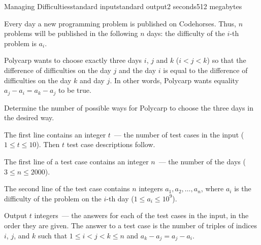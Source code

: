 \begin{problem}{Managing Difficulties}{standard input}{standard output}{2 seconds}{512 megabytes}

Every day a new programming problem is published on Codehorses. Thus, $n$ problems will be published in the following $n$ days: the difficulty of the $i$-th problem is $a_i$.

Polycarp wants to choose exactly three days $i$, $j$ and $k$ ($i < j < k$) so that the difference of difficulties on the day $j$ and the day $i$ is equal to the difference of difficulties on the day $k$ and day $j$.
In other words, Polycarp wants equality $a_j-a_i=a_k-a_j$ to be true.

Determine the number of possible ways for Polycarp to choose the three days in the desired way.

\InputFile
The first line contains an integer $t$~--- the number of test cases in the input ($1 \le t \le 10$). Then $t$ test case descriptions follow.

The first line of a test case contains an integer $n$~--- the number of the days ($3 \le n \le 2000$).

The second line of the test case contains $n$ integers $a_1, a_2, \dots, a_n$, where $a_i$ is the difficulty of the problem on the $i$-th day ($1 \le a_i \le 10^9$).


\OutputFile
Output $t$ integers~--- the answers for each of the test cases in the input, in the order they are given. The answer to a test case is the number of triples of indices $i$, $j$, and $k$ such that $1 \le i < j < k \le n$ and $a_k-a_j=a_j-a_i$.

\Example

\begin{example}
%
\end{example}

\end{problem}

